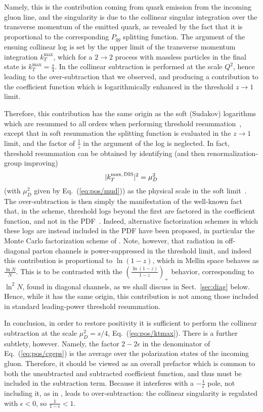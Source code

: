 Namely, this is the
contribution coming from quark emission from the incoming gluon line,
and the singularity is due to the collinear singular integration over
the transverse momentum of the emitted quark, as revealed by the fact
that it is proportional to the corresponding $P_{qg}$ splitting
function. The argument of the ensuing collinear log is set by the
upper limit of the transverse momentum integration $k_T^{\textrm{max}}$,
which for a $2\to2$ process with massless particles in the final state
is $k_T^{\textrm{max}}=\frac{s}{4}$. In \msbar{}
the collinear subtraction is performed at the scale $Q^2$,
hence leading to the over-subtraction that we observed, and producing
a contribution to the coefficient function which is logarithmically
enhanced in the threshold $z\to1$ limit.

Therefore, this contribution has the same origin as the soft (Sudakov)
logarithms 
which are resummed to all orders
when performing threshold
resummation~\cite{Catani:1989ne,Sterman:1986aj}, except that 
in soft resummation the splitting function is evaluated in the $z\to1$
limit, and the factor of $\frac{1}{z}$ in the argument of the log is
neglected.
In fact, threshold resummation can be
obtained by identifying (and then
renormalization-group improving)
\begin{equation}\label{eq:pos/ktmax}
 |k_T^{\textrm{max,\,DIS}}|^2=\mu_D^2
\end{equation}
(with $\mu_D^2$ given by Eq.~(\ref{eq:pos/mud}))
  as the physical
scale in the soft limit~\cite{Forte:2002ni}. The over-subtraction is then
simply the manifestation of the well-known fact that, in the \msbar{} scheme,
threshold logs beyond the first are factored in the coefficient
function, and not in the PDF~\cite{Albino:2000cp}. Indeed, alternative
factorization schemes in which these logs are instead included in the
PDF have been proposed, in particular  the Monte Carlo
factorization scheme of \cite{Jadach:2016acv}. Note, however, that
radiation in off-diagonal parton channels is power-suppressed in the
threshold limit, and indeed this contribution is proportional to
$\ln(1-z)$, which in Mellin space behaves as $\frac{\ln N}{N}$. This is to be
contrasted with the $\left(\frac{\ln(1-z)}{1-z}\right)_+$ behavior, corresponding to 
$\ln^2 N$, found in diagonal channels, as we shall discuss in
Sect.~\ref{sec:diag} below. Hence, while it has the same origin, this
contribution is not among those included in standard leading-power
threshold resummation. 

In conclusion,  in order to
restore positivity it is  sufficient to perform the collinear
subtraction at the scale $\mu_D^2=s/4$, Eq.~(\ref{eq:pos/ktmax}).
There is a further subtlety, however. Namely, the factor $2-2\epsilon$
in the denominator of Eq.~(\ref{eq:pos/cgeps}) is the average over the
polarization states of the incoming gluon. Therefore, it should be
viewed as an overall prefactor which is common to both the
unsubtracted and subtracted coefficient function, and thus  must be
included in the subtraction term. Because it interferes with a
$-\frac{1}{\epsilon}$ pole, not including it, as in \msbar{}, leads to
over-subtraction: 
the collinear singularity is regulated with
$\epsilon<0$, so $\frac{1}{1-\epsilon}<1$.  

